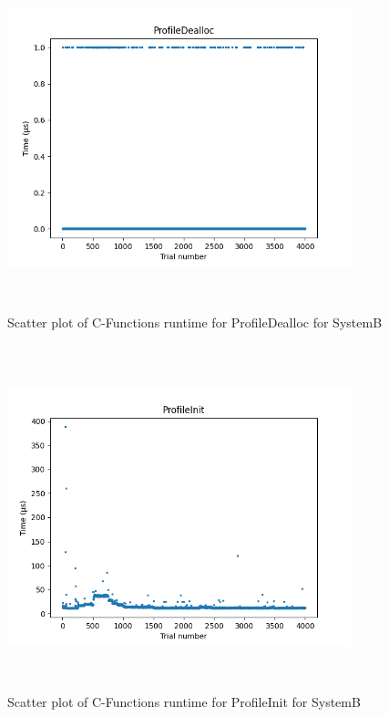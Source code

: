 \begin{figure}[H]
	\centering
	\includegraphics[width=10cm,height=10cm,keepaspectratio]{RuntimeResults_SystemB/CFunctions/ProfileDealloc_scatter.png}
	\caption{Scatter plot of C-Functions runtime for ProfileDealloc for SystemB}
	\label{fig:C-Functions|ProfileDealloc|SystemB}
\end{figure}

\begin{figure}[H]
	\centering
	\includegraphics[width=10cm,height=10cm,keepaspectratio]{RuntimeResults_SystemB/CFunctions/ProfileInit_scatter.png}
	\caption{Scatter plot of C-Functions runtime for ProfileInit for SystemB}
	\label{fig:C-Functions|ProfileInit|SystemB}
\end{figure}

